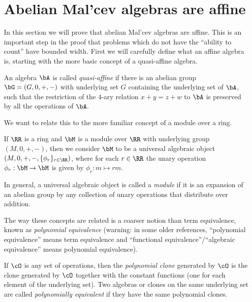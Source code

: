 \section{Abelian Mal'cev algebras are affine}\label{s-abelian-malcev}

In this section we will prove that abelian Mal'cev algebras are affine. This is an important step in the proof that problems which do not have the ``ability to count'' have bounded width. First we will carefully define what an affine algebra is, starting with the more basic concept of a quasi-affine algebra.

\begin{defn} An algebra $\bA$ is called \emph{quasi-affine} if there is an abelian group $\bG = (G,0,+,-)$ with underlying set $G$ containing the underlying set of $\bA$, such that the restriction of the $4$-ary relation $x+y = z+w$ to $\bA$ is preserved by all the operations of $\bA$.
\end{defn}

We want to relate this to the more familiar concept of a module over a ring.

\begin{defn} If $\RR$ is a ring and $\bM$ is a module over $\RR$ with underlying group $(M,0,+,-)$, then we consider $\bM$ to be a universal algebraic object $(M,0,+,-,\{\phi_r\}_{r \in \RR})$, where for each $r\in\RR$ the unary operation $\phi_r : \bM \rightarrow \bM$ is given by $\phi_r : m \mapsto rm$.

In general, a universal algebraic object is called a \emph{module} if it is an expansion of an abelian group by any collection of unary operations that distribute over addition.
\end{defn}

The way these concepts are related is a coarser notion than term equivalence, known as \emph{polynomial equivalence} (warning: in some older references, ``polynomial equivalence'' means term equivalence and ``functional equivalence''/``algebraic equivalence'' means polynomial equivalence).

\begin{defn} If $\cO$ is any set of operations, then the \emph{polynomial clone} generated by $\cO$ is the clone generated by $\cO$ together with the constant functions (one for each element of the underlying set). Two algebras or clones on the same underlying set are called \emph{polynomially equivalent} if they have the same polynomial clones.
\end{defn}

